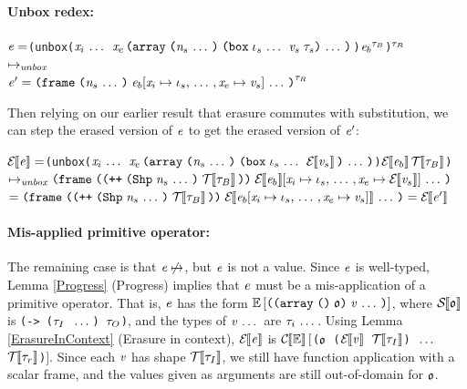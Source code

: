 \begin{sproof}
  \paragraph{Unbox redex:}
  \newcommand{\unboxvars}{\sequence{\var_i}\text{ }\var_e}
  \newcommand{\unboxval}{\annotate%
    {\arrlit{\sequence{\dsum{\sequence{\idx_s}}{\val_s}{\type_s}}}{\sequence{\nat_s}}}}
  \newcommand{\unboxbody}{\annotate[\type_B]{\expr_b}}
  \newcommand{\unboxresult}
  {\notedfrm[\type_R]
    {\sequence{\multisubst{\expr_b}{\sequence{\singlesubst{\var_i}{\idx_s},},
          \singlesubst{\var_e}{\val_s}}}}
    {\sequence{\nat_s}}}
  \newcommand{\erasedunboxval}
  {\arrlit{\sequence{\dsum{\sequence{\idx_s}}{\EraseE{\val_s}}{}}}{\sequence{\nat_s}}}
  \newcommand{\erasedunboxresult}
  {\frm
    {\sequence{\multisubst{\EraseE{\expr_b}}{\sequence{\singlesubst{\var_i}{\idx_s},},
          \singlesubst{\var_e}{\EraseE{\val_s}}}}}
    {\idxappend{\idxshape{\sequence{\nat_s}} \; \EraseT{\type_B}}}}
  \newcommand{\rewrittenunboxresult}
  {\frm
    {\sequence{\EraseE{\multisubst{\expr_b}{\sequence{\singlesubst{\var_i}{\idx_s},},
            \singlesubst{\var_e}{\val_s}}}}}
    {\idxappend{\idxshape{\sequence{\nat_s}} \; \EraseT{\type_B}}}}
\begin{alltt}
\(\expr = \)(unbox (\(\unboxvars\) \(\unboxval\)) \(\unboxbody\))\(\sp{\type\sb{R}}\)\\
\(\mapsto\sb{\mathit{unbox}}\)\\
\(\expr' = \unboxresult\)
\end{alltt}
Then relying on our earlier result that erasure commutes with substitution,
we can step the erased version of $\mathit{e}$ to get the erased version of $\mathit{e}'$:
\begin{alltt}
\(\EraseE{\expr} = \) (unbox (\(\unboxvars\) \(\erasedunboxval\)) \(\EraseE{\expr\sb{b}}\) \(\EraseT{\type\sb{B}}\))\\
\(\mapsto\sb{\mathit{unbox}} \erasedunboxresult\)\\
\( = \rewrittenunboxresult = \EraseE{\expr'}\)
\end{alltt}

\paragraph{Mis-applied primitive operator:}
The remaining case is that $\mathit{e} \not\mapsto$, but $\mathit{e}$ is not a value.
Since $\mathit{e}$ is well-typed, Lemma \ref{Progress} (Progress) implies that
$\mathit{e}$ must be a mis-application of a primitive operator.
That is, $\mathit{e}$ has the form
$\ctxt\left[\misapp\right]$,
where $\mathcal{S}{\hskip-.25em}\left\llbracket\mathfrak{o}\right\rrbracket$ is
{\tt (-> ($\mathit{\tau}_I$ $\, \ldots \,$) $\mathit{\tau}_O$)},
and the types of $\mathit{v} \, \ldots \,$ are $\mathit{\tau}_i \, \ldots \,$.
Using Lemma \ref{ErasureInContext} (Erasure in context),
$\mathcal{E}{\hskip-.25em}\left\llbracket \mathit{e} \right\rrbracket$ is
$\mathcal{C}{\hskip-.25em}\left\llbracket \mathbb{E} \right\rrbracket[${\tt ($\mathfrak{o}$ ($\mathcal{E}{\hskip-.25em}\left\llbracket \mathit{v} \right\rrbracket$ $\mathcal{T}{\hskip-.25em}\left\llbracket \mathit{\tau}_I \right\rrbracket$) $\, \ldots \,$ $\mathcal{T}{\hskip-.25em}\left\llbracket \mathit{\tau}_r \right\rrbracket$)}$]$.
Since each $\mathit{v}$ has shape $\mathcal{T}{\hskip-.25em}\left\llbracket \mathit{\tau}_I \right\rrbracket$,
we still have function application with a scalar frame,
and the values given as arguments are still out-of-domain for $\mathfrak{o}$.
\end{sproof}

